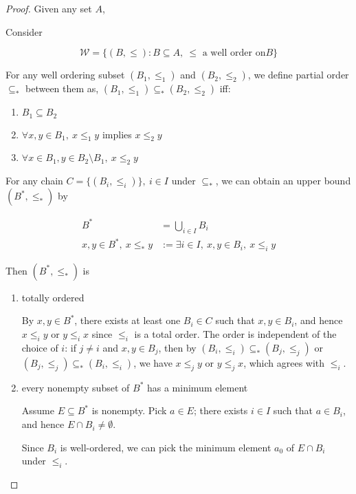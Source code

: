 \begin{proof}
    Given any set $A$,

    Consider

    \[
        \mathscr{W} = \{(B, \le): B \subseteq A,\: \le \text{ a well order on} B \}
    \]

    For any well ordering subset $(B_1, \le_1)$ and $(B_2, \le_2)$, we define partial order $\subseteq_*$
    between them as, $(B_1, \le_1) \subseteq_* (B_2, \le_2)$ iff:

    \begin{enumerate}
        \item $B_1 \subseteq B_2$
        \item $\forall x,y \in B_1,\: x \le_1 y $ implies $x \le_2 y$
        \item $\forall x \in B_1, y \in B_2 \setminus B_1,\: x \le_2 y$
    \end{enumerate}

    For any chain $C = \{ (B_i, \le_i) \},\: i \in I$ under $\subseteq_*$, we can obtain an upper bound $(B^*, \le_*)$ by

    \begin{align*}
        B^* &= \bigcup_{i \in I} B_i \\
        x,y \in B^*,\: x \le_* y & := \exists i \in I,\: x,y \in B_i,\: x \le_i y
    \end{align*}

    Then $(B^*, \le_*)$ is 

    \begin{enumerate}
        \item totally ordered

        By $x,y \in B^*$, there exists at least one $B_i \in C$ such that $x, y \in B_i$, and hence $x \le_i y$ or $y \le_i x$ since $\le_i$
        is a total order. The order is independent of the choice of $i$: if $j \ne i$ and $x,y \in B_j$, 
        then by $(B_i, \le_i) \subseteq_* (B_j, \le_j)$ or $(B_j, \le_j) \subseteq_* (B_i, \le_i)$, we have $x \le_j y$ or $y \le_j x$, 
        which agrees with $\le_i$.

        \item every nonempty subset of $B^*$ has a minimum element

        Assume $E \subseteq B^*$ is nonempty. Pick $a \in E$; there 
        exists $i \in I$ such that $a \in B_i$, and hence $E \cap B_i \ne \emptyset$.

        Since $B_i$ is well-ordered, we can pick the minimum element $a_0$ of $E \cap B_i$ under $\le_i$. 


\end{enumerate}
\end{proof}
